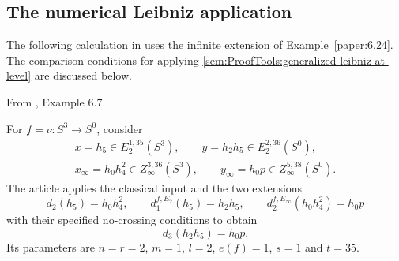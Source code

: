 \subsection{The numerical Leibniz application}

The following calculation in \cite{LWX126} uses the infinite extension
of Example~\ref{paper:6.24}. The comparison conditions for applying
\ref{sem:ProofTools:generalized-leibniz-at-level} are discussed below.

\begin{proposition}
\label{paper:6.7}
\label{exam:Leibnizyes}
From \cite{LWX126}, Example 6.7.\par
For $f=\nu:S^3\to S^0$, consider
\[
\begin{gathered}
x=h_5\in E_2^{1,35}(S^3),\qquad
y=h_2h_5\in E_2^{2,36}(S^0),\\
x_\infty=h_0h_4^2\in Z_\infty^{3,36}(S^3),\qquad
y_\infty=h_0p\in Z_\infty^{5,38}(S^0).
\end{gathered}
\]
The article applies the classical input and the two extensions
\[
d_2(h_5)=h_0h_4^2,\qquad
d_1^{f,E_2}(h_5)=h_2h_5,\qquad
d_2^{f,E_\infty}(h_0h_4^2)=h_0p
\]
with their specified no-crossing conditions to obtain
\[
d_3(h_2h_5)=h_0p.
\]
Its parameters are $n=r=2$, $m=1$, $l=2$, $e(f)=1$, $s=1$ and $t=35$.
\end{proposition}
